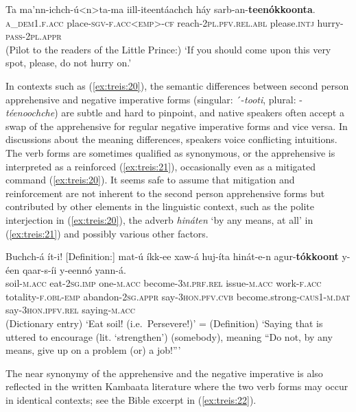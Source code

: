 \documentclass[output=paper,colorlinks,citecolor=brown,
]{langsci/langscibook}
\begin{document}
\ea\label{ex:treis:20} 
\gll Ta	ma'nn-ichch-ú<n>ta-ma	iill-iteentáachch háy			sarb-an-\textbf{teenókkoonta}. \\
\textsc{a\_dem1.f.acc} place-\textsc{sgv-f.acc<emp>-cf}	reach-\textsc{2pl.pfv.rel.abl} please.\textsc{intj}	hurry-\textsc{pass-2pl.appr}\\
\glt (Pilot to the readers of the Little Prince:) `If you should come upon this very spot, please, do not hurry on.' \citep[95]{Saint-Exupéry2018}
\z 

 In contexts such as (\ref{ex:treis:20}), the semantic differences between second person apprehensive and negative imperative forms (singular: ´-\textit{tooti}, plural: \nobreakdash-\textit{téenoochche}) are subtle and hard to pinpoint, and native speakers often accept a swap of the apprehensive for regular negative imperative forms and vice versa. In discussions about the meaning differences, speakers voice conflicting intuitions. The verb forms are sometimes qualified as synonymous, or the apprehensive is interpreted as a reinforced (\ref{ex:treis:21}), occasionally even as a mitigated command (\ref{ex:treis:20}). It seems safe to assume that mitigation and reinforcement are not inherent to the second person apprehensive forms but contributed by other elements in the linguistic context, such as the polite interjection in (\ref{ex:treis:20}), the adverb \textit{hináten} `by any means, at all' in (\ref{ex:treis:21}) and possibly various other factors. 

\ea\label{ex:treis:21} 
\gll Buchch-á ít-i!	\textnormal{[Definition:]} mat-ú íkk-ee xaw-á huj-íta hinát-e-n agur-\textbf{tókkoont} y-éen qaar-s-íi		y-eennó yann-á. \\
soil-\textsc{m.acc} eat-\textsc{2sg.imp} {} one-\textsc{m.acc}	become-\textsc{3m.prf.rel}	issue-\textsc{m.acc} work-\textsc{f.acc} totality-\textsc{f.obl-emp}	abandon-\textsc{2sg.appr}		say-\textsc{3hon.pfv.cvb} become.strong-\textsc{caus1-m.dat}	say-\textsc{3hon.ipfv.rel} saying-\textsc{m.acc}\\
\glt (Dictionary entry) `Eat soil! (i.e.\  Persevere!)' = (Definition) `Saying that is uttered to encourage (lit. `strengthen') (somebody), meaning ``Do not, by any means, give up on a problem (or) a job!''' \citep[158]{Alemu2016}
\z 

The near synonymy of the apprehensive and the negative imperative is also reflected in the written Kambaata literature where the two verb forms may occur in identical contexts; see the Bible excerpt in (\ref{ex:treis:22}).
\end{document}
